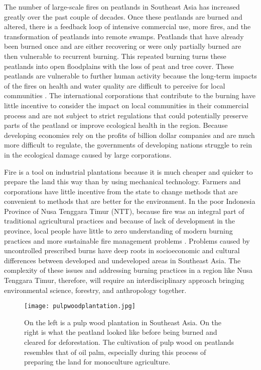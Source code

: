 The number of large-scale fires on peatlands in Southeast Asia has increased greatly over the past couple of decades. Once these peatlands are burned and altered, there is a feedback loop of intensive commercial use, more fires, and the transformation of peatlands into remote swamps. Peatlands that have already been burned once and are either recovering or were only partially burned are then vulnerable to recurrent burning. This repeated burning turns these peatlands into open floodplains with the loss of peat and tree cover. These peatlands are vulnerable to further human activity because the long-term impacts of the fires on health and water quality are difficult to perceive for local communities \citep{chokkalingam2005fire}. The international corporations that contribute to the burning have little incentive to consider the impact on local communities in their commercial process and are not subject to strict regulations that could potentially preserve parts of the peatland or improve ecological health in the region. Because developing economies rely on the profits of billion dollar companies and are much more difficult to regulate, the governments of developing nations struggle to rein in the ecological damage caused by large corporations.

Fire is a tool on industrial plantations because it is much cheaper and quicker to prepare the land this way than by using mechanical technology. Farmers and corporations have little incentive from the state to change methods that are convenient to methods that are better for the environment. In the poor Indonesia Province of Nusa Tenggara Timur (NTT), because fire was an integral part of traditional agricultural practices and because of lack of development in the province, local people have little to zero understanding of modern burning practices and more sustainable fire management problems \citep{russell2007rural}. Problems caused by uncontrolled prescribed burns have deep roots in socioeconomic and cultural differences between developed and undeveloped areas in Southeast Asia. The complexity of these issues and addressing burning practices in a region like Nusa Tenggara Timur, therefore, will require an interdisciplinary approach bringing environmental science, forestry, and anthropology together.  

\begin{figure}
  \texttt{[image: pulpwoodplantation.jpg]}
  \caption{On the left is a pulp wood plantation in Southeast Asia. On the right is what the peatland looked like before being burned and cleared for deforestation. The cultivation of pulp wood on peatlands resembles that of oil palm, especially during this process of preparing the land for monoculture agriculture.}
  \label{fig:pulpwoodplantation}
\end{figure}

